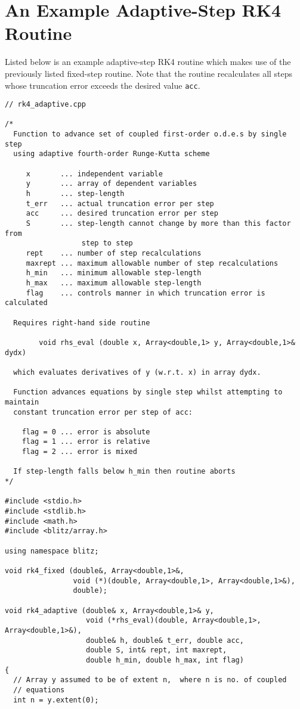 \section{An Example Adaptive-Step RK4 Routine}
Listed below is an example adaptive-step RK4 routine which makes use of the previously
listed fixed-step routine. Note that the routine recalculates all steps whose truncation
error exceeds the desired value {\tt acc}.
{\small\begin{verbatim}
// rk4_adaptive.cpp 

/*
  Function to advance set of coupled first-order o.d.e.s by single step
  using adaptive fourth-order Runge-Kutta scheme

     x       ... independent variable
     y       ... array of dependent variables
     h       ... step-length
     t_err   ... actual truncation error per step 
     acc     ... desired truncation error per step
     S       ... step-length cannot change by more than this factor from
                  step to step
     rept    ... number of step recalculations		  
     maxrept ... maximum allowable number of step recalculations		  
     h_min   ... minimum allowable step-length
     h_max   ... maximum allowable step-length
     flag    ... controls manner in which truncation error is calculated	

  Requires right-hand side routine 

        void rhs_eval (double x, Array<double,1> y, Array<double,1>& dydx)

  which evaluates derivatives of y (w.r.t. x) in array dydx.

  Function advances equations by single step whilst attempting to maintain 
  constant truncation error per step of acc:

    flag = 0 ... error is absolute
    flag = 1 ... error is relative
    flag = 2 ... error is mixed

  If step-length falls below h_min then routine aborts
*/

#include <stdio.h>
#include <stdlib.h>
#include <math.h>
#include <blitz/array.h>

using namespace blitz;

void rk4_fixed (double&, Array<double,1>&, 
                void (*)(double, Array<double,1>, Array<double,1>&), 
                double);

void rk4_adaptive (double& x, Array<double,1>& y, 
                   void (*rhs_eval)(double, Array<double,1>, Array<double,1>&),
                   double& h, double& t_err, double acc, 
                   double S, int& rept, int maxrept, 
                   double h_min, double h_max, int flag)
{
  // Array y assumed to be of extent n,  where n is no. of coupled
  // equations
  int n = y.extent(0);


\end{verbatim}}
